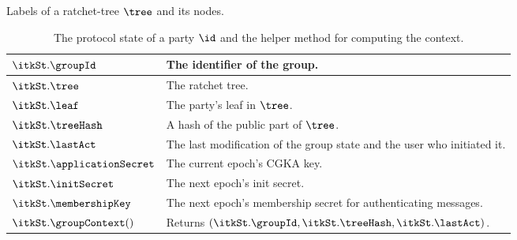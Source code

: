 \begin{table*}[!t]
\begin{minipage}[t]{.48\textwidth}
	\caption{Labels of a ratchet-tree $\tree$ and its nodes.}
	\label{tab:node_labels}
  \end{minipage}
  \hfill
  \begin{minipage}[t]{.48\textwidth}
  	\begin{tabularx}{\textwidth}{| l | X |}
  		\hline
  		$\itkSt.\groupId$ & The identifier of the group.\\
  		\hline
  		$\itkSt.\tree$ & The ratchet tree.\\
  		\hline
  		$\itkSt.\leaf$ & The party's leaf in $\tree$.\\
  		\hline
  		$\itkSt.\treeHash$ & A hash of the public part of $\tree$.\\
  		\hline
      $\itkSt.\lastAct$ & The last modification of the group state and the user who initiated it.\\
  		\hline
  		$\itkSt.\applicationSecret$ & The current epoch's CGKA key.\\
  		\hline
  		$\itkSt.\initSecret$ & The next epoch's init secret.\\
  		\hline
      $\itkSt.\membershipKey$ & The next epoch's membership secret for authenticating messages.\\
  		\hline
  		$\itkSt.\groupContext()$ & Returns $(\itkSt.\groupId, \itkSt.\treeHash, \itkSt.\lastAct)$.\\
  		\hline
  	\end{tabularx}
    \caption{The protocol state of a party $\id$ and the helper method for computing the context.}
    \label{tab:prot-state}
  \end{minipage}


\end{table*}
